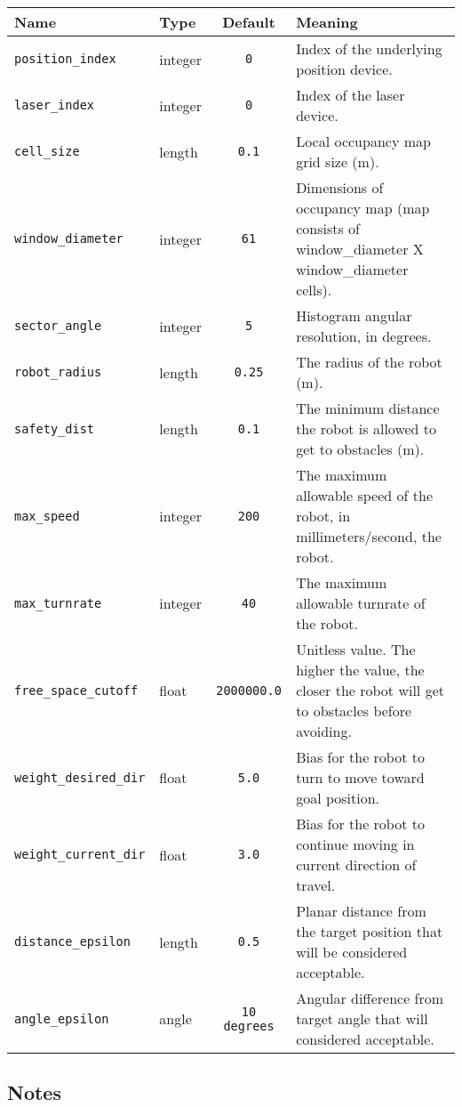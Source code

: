 \begin{center}
{\small \begin{tabularx}{\columnwidth}{|l|l|c|X|}
\hline
Name & Type & Default & Meaning\\
\hline
{\tt position\_index} & integer & {\tt 0} & Index of the underlying position device.\\
{\tt laser\_index} & integer & {\tt 0} & Index of the laser device.\\
{\tt cell\_size} & length & {\tt 0.1} & Local occupancy map grid size (m).\\
{\tt window\_diameter} & integer & {\tt 61} & Dimensions of occupancy map (map consists of window\_diameter X window\_diameter cells).\\
{\tt sector\_angle} & integer & {\tt 5} & Histogram angular resolution, in degrees.\\
{\tt robot\_radius} & length & {\tt 0.25} & The radius of the robot (m).\\
{\tt safety\_dist} & length & {\tt 0.1} & The minimum distance the robot is allowed to get to obstacles (m).\\
{\tt max\_speed} & integer & {\tt 200} & The maximum allowable speed of the robot, in millimeters/second, the robot.\\
{\tt max\_turnrate} & integer & {\tt 40} & The maximum allowable turnrate of the robot.\\
{\tt free\_space\_cutoff} & float & {\tt 2000000.0} & Unitless value.  The higher the value, the closer the robot will get to obstacles before avoiding. \\
{\tt weight\_desired\_dir} & float & {\tt 5.0} & Bias for the robot to turn to move toward goal position.\\
{\tt weight\_current\_dir} & float & {\tt 3.0} & Bias for the robot to continue moving in current direction of travel.\\
{\tt distance\_epsilon} & length & {\tt 0.5} & Planar distance from
the target position that will be considered acceptable.\\
{\tt angle\_epsilon} & angle & {\tt 10 degrees} & Angular difference from
target angle that will considered acceptable.\\
\hline
\end{tabularx}}
\end{center}

\subsection*{Notes}

